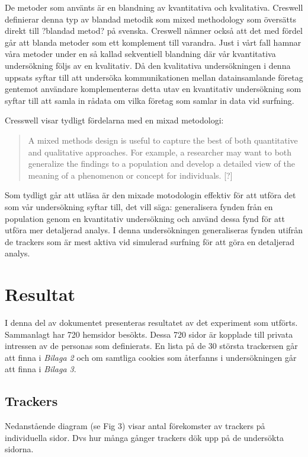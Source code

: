 \documentclass[a4paper,11pt]{article}
\begin{document}
{De metoder som använts är en blandning av kvantitativa och kvalitativa. Creswell \cite{Creswell} definierar denna typ av blandad metodik som mixed methodology som översätts direkt till ?blandad metod? på svenska. Creswell \cite{Creswell} nämner också att det med fördel går att blanda metoder som ett komplement till varandra. Just i vårt  fall hamnar våra metoder under en så kallad sekventiell blandning där vår kvantitativa undersökning följs av en kvalitativ. Då den kvalitativa undersökningen i denna uppsats syftar till att undersöka kommunikationen mellan datainsamlande företag gentemot användare komplementeras detta utav en kvantitativ undersökning som syftar till att samla in rådata om vilka företag som samlar in data vid surfning.

Cresswell \cite{Creswell} visar tydligt fördelarna med en mixad metodologi: 

\begin{quote}
A mixed methods design is useful to capture the best of both quantitative and qualitative approaches. For example, a researcher may want to both generalize the findings to a population and develop a detailed view of the meaning of a phenomenon or concept for individuals. [?] 
\end{quote}

Som tydligt går att utläsa är den mixade motodologin effektiv för att utföra det som vår undersökning syftar till, det vill säga: generalisera fynden från en population genom en kvantitativ undersökning och använd dessa fynd för att utföra mer detaljerad analys. I denna undersökningen generaliseras fynden utifrån de trackers som är mest aktiva vid simulerad surfning för att göra en detaljerad analys. 

\section{Resultat}
I denna del av dokumentet presenteras resultatet av det experiment som utförts. Sammanlagt har 720 hemsidor besökts. Dessa 720 sidor är kopplade till privata intressen av de personas som definierats. En lista på de 30 största trackersen går att finna i \textit{Bilaga 2} och om samtliga cookies som återfanns i undersökningen går att finna i \textit{Bilaga 3}.

\subsection{Trackers}
Nedanstående diagram (se Fig 3) visar antal förekomster av trackers på individuella sidor. Dvs hur många gånger trackers dök upp på de undersökta sidorna. \\\\

}
\end{document}
